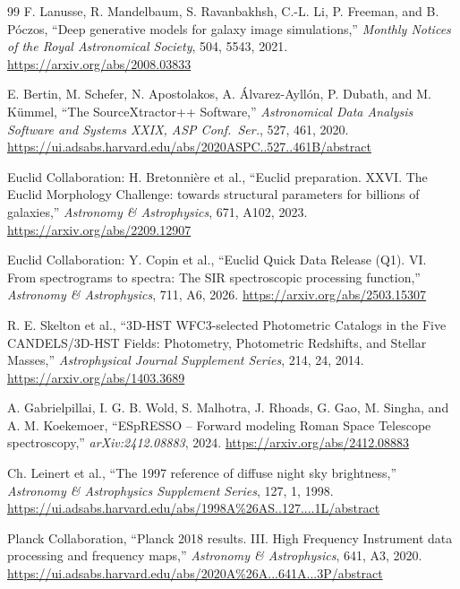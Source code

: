 \begin{thebibliography}{99}
F. Lanusse, R. Mandelbaum, S. Ravanbakhsh, C.-L. Li, P. Freeman, and B. P\'oczos,
``Deep generative models for galaxy image simulations,''
\emph{Monthly Notices of the Royal Astronomical Society}, 504, 5543, 2021.
\url{https://arxiv.org/abs/2008.03833}

E. Bertin, M. Schefer, N. Apostolakos, A. Álvarez-Ayllón, P. Dubath, and M. Kümmel,
``The SourceXtractor++ Software,''
\emph{Astronomical Data Analysis Software and Systems XXIX, ASP Conf.\ Ser.}, 527, 461, 2020.
\url{https://ui.adsabs.harvard.edu/abs/2020ASPC..527..461B/abstract}

Euclid Collaboration: H. Bretonni\`ere et al.,
``Euclid preparation. XXVI. The Euclid Morphology Challenge: towards structural parameters for billions of galaxies,''
\emph{Astronomy \& Astrophysics}, 671, A102, 2023.
\url{https://arxiv.org/abs/2209.12907}

Euclid Collaboration: Y. Copin et al.,
``Euclid Quick Data Release (Q1). VI. From spectrograms to spectra: The SIR spectroscopic processing function,''
\emph{Astronomy \& Astrophysics}, 711, A6, 2026.
\url{https://arxiv.org/abs/2503.15307}

R. E. Skelton et al.,
``3D-HST WFC3-selected Photometric Catalogs in the Five CANDELS/3D-HST
Fields: Photometry, Photometric Redshifts, and Stellar Masses,''
\emph{Astrophysical Journal Supplement Series}, 214, 24, 2014.
\url{https://arxiv.org/abs/1403.3689}

A. Gabrielpillai, I. G. B. Wold, S. Malhotra, J. Rhoads, G. Gao, M. Singha, and A. M. Koekemoer,
``ESpRESSO -- Forward modeling Roman Space Telescope spectroscopy,''
\emph{arXiv:2412.08883}, 2024.
\url{https://arxiv.org/abs/2412.08883}

Ch. Leinert et al.,
``The 1997 reference of diffuse night sky brightness,''
\emph{Astronomy \& Astrophysics Supplement Series}, 127, 1, 1998.
\url{https://ui.adsabs.harvard.edu/abs/1998A\%26AS..127....1L/abstract}

Planck Collaboration,
``Planck 2018 results. III. High Frequency Instrument data processing and frequency maps,''
\emph{Astronomy \& Astrophysics}, 641, A3, 2020.
\url{https://ui.adsabs.harvard.edu/abs/2020A\%26A...641A...3P/abstract}


\end{thebibliography}
